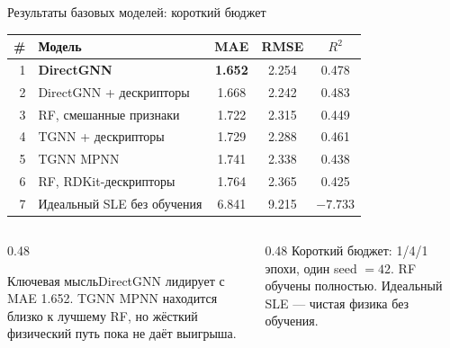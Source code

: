 \documentclass[aspectratio=169,10pt]{beamer}
\newcommand{\smallnote}[1]{{\scriptsize\color{TGSlate}#1}}
\newcommand{\keybox}[1]{\begin{block}{Ключевая мысль}#1\end{block}}
\begin{document}
\begin{frame}{Результаты базовых моделей: короткий бюджет}
  \centering
  \scriptsize
  \setlength{\tabcolsep}{4pt}
  \begin{tabular}{rlccc}
    \toprule
    \textbf{\#} & \textbf{Модель} & \textbf{MAE} & \textbf{RMSE} & \textbf{$R^2$}\\
    \midrule
    1 & \textbf{DirectGNN} & \textbf{1.652} & 2.254 & 0.478\\
    2 & DirectGNN + дескрипторы & 1.668 & 2.242 & 0.483\\
    3 & RF, смешанные признаки & 1.722 & 2.315 & 0.449\\
    4 & TGNN + дескрипторы & 1.729 & 2.288 & 0.461\\
    5 & TGNN MPNN & 1.741 & 2.338 & 0.438\\
    6 & RF, RDKit-дескрипторы & 1.764 & 2.365 & 0.425\\
    7 & Идеальный SLE без обучения & 6.841 & 9.215 & $-7.733$\\
    \bottomrule
  \end{tabular}

  \vspace{0.6em}
  \begin{columns}[T,onlytextwidth]
    \begin{column}{0.48\textwidth}
      \keybox{\scriptsize DirectGNN лидирует с MAE 1.652. TGNN MPNN находится близко к лучшему RF, но жёсткий физический путь пока не даёт выигрыша.}
    \end{column}
    \begin{column}{0.48\textwidth}
      \smallnote{Короткий бюджет: 1/4/1 эпохи, один seed $=42$. RF обучены полностью. Идеальный SLE — чистая физика без обучения.}
    \end{column}
  \end{columns}
\end{frame}
\end{document}
